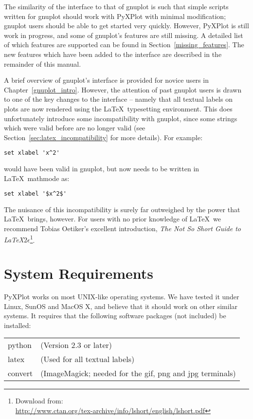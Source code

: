 The similarity of the interface to that of gnuplot is such that simple scripts
written for gnuplot should work with PyXPlot with minimal modification; gnuplot
users should be able to get started very quickly.  However, PyXPlot is still
work in progress, and some of gnuplot's features are still missing.  A detailed
list of which features are supported can be found in
Section~\ref{missing_features}. The new features which have been added to the
interface are described in the remainder of this manual.

A brief overview of gnuplot's interface is provided for novice users in
Chapter~\ref{gnuplot_intro}. However, the attention of past gnuplot users is
drawn to one of the key changes to the interface -- namely that all textual
labels on plots are now rendered using the \LaTeX\ typesetting environment. This
does unfortunately introduce some incompatibility with gnuplot, since some
strings which were valid before are no longer valid (see
Section~\ref{sec:latex_incompatibility} for more details). For example:

\begin{verbatim}set xlabel 'x^2'\end{verbatim}

\noindent would have been valid in gnuplot, but now needs to be written in
\LaTeX\ mathmode as:

\begin{verbatim}set xlabel '$x^2$'\end{verbatim}

\noindent The nuisance of this incompatibility is surely far outweighed by the
power that \LaTeX\ brings, however. For users with no prior knowledge of
\LaTeX\ we recommend Tobias Oetiker's excellent introduction, \textit{The Not
So Short Guide to \LaTeX $2\epsilon$}\footnote{Download from:\\
\url{http://www.ctan.org/tex-archive/info/lshort/english/lshort.pdf}}.

\section{System Requirements}

PyXPlot works on most UNIX-like operating systems. We have tested it under
Linux, SunOS and MacOS X, and believe that it should work on other similar
systems. It requires that the following software packages (not included) be
installed:

\vspace{0.5cm}
\begin{tabular}{ll}
python  & (Version 2.3 or later) \\
latex   & (Used for all textual labels) \\
convert & (ImageMagick; needed for the gif, png and jpg terminals) \\
\end{tabular}
\vspace{0.5cm}

